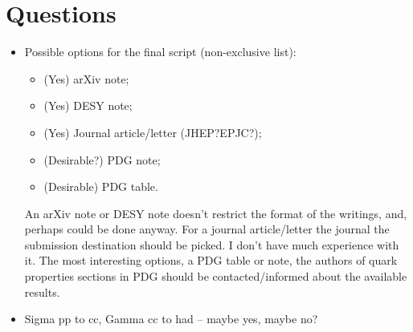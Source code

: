 
\section{Questions}
\begin{itemize}
\item {Possible options for  the final script (non-exclusive list):
\begin{itemize}
\item (Yes) arXiv note;
\item (Yes) DESY note;
\item (Yes) Journal article/letter (JHEP?EPJC?);
\item (Desirable?) PDG note;
\item (Desirable) PDG table.
\end{itemize}
An arXiv note or DESY note doesn't restrict the format of the writings, and, perhaps could be done anyway.
For a journal article/letter the journal the submission destination should be picked. I don't have much experience with it.
The most interesting options,   a PDG table or note, the authors of quark properties sections in  PDG should be contacted/informed about
 the available results.
}

\end{itemize}

\begin{itemize}
\item Sigma pp to cc, Gamma cc to had  -- maybe yes, maybe no?
\end{itemize}
\clearpage
\newpage
